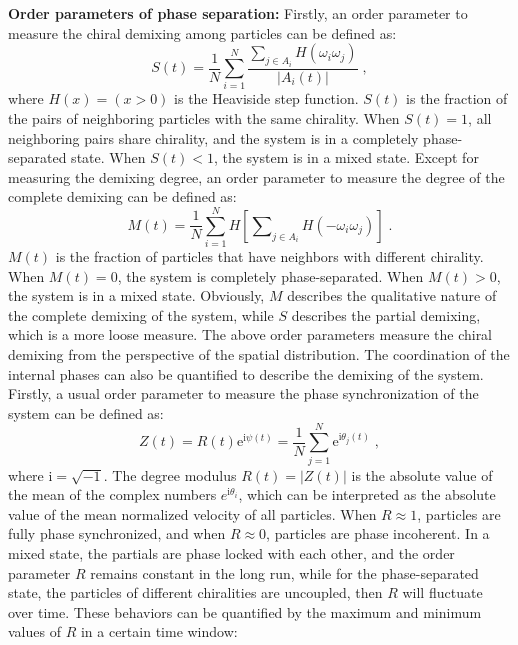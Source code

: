 \documentclass[a4paper, amsfonts, amssymb, amsmath, reprint, showkeys, showpacs, nofootinbib, twoside]{revtex4-2}
\begin{document}
\textbf{Order parameters of phase separation:} Firstly, an order parameter to measure the chiral demixing among particles can be defined as:
\begin{equation}
    S\left( t \right) =\frac{1}{N}\sum_{i=1}^N{\frac{\sum_{j\in A_i}{H\left( \omega _i\omega _j \right)}}{\left| A_i\left( t \right) \right|}}\;,
\end{equation}
where $H\left( x \right) =\left( x>0 \right)$ is the Heaviside step function. $S\left( t \right)$ is the fraction of the pairs of neighboring particles with the same chirality. When $S\left( t \right)=1$, all neighboring pairs share chirality, and the system is in a completely phase-separated state. When $S\left( t \right)< 1$, the system is in a mixed state.
Except for measuring the demixing degree, an order parameter to measure the degree of the complete demixing can be defined as:
\begin{equation}
    M\left( t \right) =\frac{1}{N}\sum_{i=1}^N{H\left[ \sum\nolimits_{j\in A_i}^{}{H\left( -\omega _i\omega _j \right)} \right]}\;.
\end{equation}
$M\left( t \right)$ is the fraction of particles that have neighbors with different chirality. When $M\left( t \right)=0$, the system is completely phase-separated. When $M\left( t \right)> 0$, the system is in a mixed state. Obviously, $M$ describes the qualitative nature of the complete demixing of the system, while $S$ describes the partial demixing, which is a more loose measure.
The above order parameters measure the chiral demixing from the perspective of the spatial distribution. 
The coordination of the internal phases can also be quantified to describe the demixing of the system. Firstly, a usual order parameter to measure the phase synchronization of the system can be defined as: 
\begin{equation}
    Z\left( t \right) =R\left( t \right) \mathrm{e}^{\mathrm{i}\psi \left( t \right)}=\frac{1}{N}\sum_{j=1}^N{\mathrm{e}^{\mathrm{i}\theta _j\left( t \right)}}\;,
\end{equation}
where $\textrm{i}=\sqrt{-1}$. The degree modulus $R(t)=\left|Z(t)\right|$ is the absolute value of the mean of the complex numbers $e^{\textrm{i}\theta _i}$, which can be interpreted as the absolute value of the mean normalized velocity of all particles. When $R\approx 1$, particles are fully phase synchronized, and when $R\approx0$, particles are phase incoherent.
In a mixed state, the partials are phase locked with each other, and the order parameter $R$ remains constant in the long run, while for the phase-separated state, the particles of different chiralities are uncoupled, then $R$ will fluctuate over time. These behaviors can be quantified by the maximum and minimum values of $R$ in a certain time window:
\end{document}

